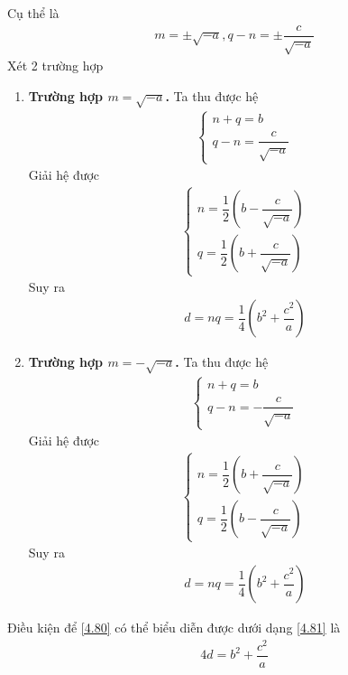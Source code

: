 \documentclass[a4paper,oneside]{book}
\numberwithin{equation}{chapter}
\begin{document}
Cụ thể là
\begin{align}
m =  \pm \sqrt { - a} ,q - n =  \pm \dfrac{c}{{\sqrt { - a} }}
\end{align}
Xét 2 trường hợp
\begin{enumerate}
\item \textbf{Trường hợp $m = \sqrt { - a} $.} Ta thu được hệ
\begin{align}
\left\{ {\begin{array}{*{20}{c}}
{n + q = b}\\
{q - n = \dfrac{c}{{\sqrt { - a} }}}
\end{array}} \right.
\end{align}
Giải hệ được 
\begin{align}
\left\{ {\begin{array}{*{20}{c}}
{n = \dfrac{1}{2}\left( {b - \dfrac{c}{{\sqrt { - a} }}} \right)}\\
{q = \dfrac{1}{2}\left( {b + \dfrac{c}{{\sqrt { - a} }}} \right)}
\end{array}} \right.
\end{align}
Suy ra 
\begin{align}
d = nq = \dfrac{1}{4}\left( {{b^2} + \dfrac{{{c^2}}}{a}} \right)
\end{align}
\item \textbf{Trường hợp $m = -\sqrt { - a} $.} Ta thu được hệ
\begin{align}
\left\{ {\begin{array}{*{20}{c}}
{n + q = b}\\
{q - n =  - \dfrac{c}{{\sqrt { - a} }}}
\end{array}} \right.
\end{align}
Giải hệ được 
\begin{align}
\left\{ {\begin{array}{*{20}{c}}
{n = \dfrac{1}{2}\left( {b + \dfrac{c}{{\sqrt { - a} }}} \right)}\\
{q = \dfrac{1}{2}\left( {b - \dfrac{c}{{\sqrt { - a} }}} \right)}
\end{array}} \right.
\end{align}
Suy ra 
\begin{align}
d = nq = \dfrac{1}{4}\left( {{b^2} + \dfrac{{{c^2}}}{a}} \right)
\end{align}
\end{enumerate}

Điều kiện để \eqref{4.80} có thể biểu diễn được dưới dạng \eqref{4.81} là
\begin{align}
4d = {b^2} + \dfrac{{{c^2}}}{a}
\end{align}
\end{document}
